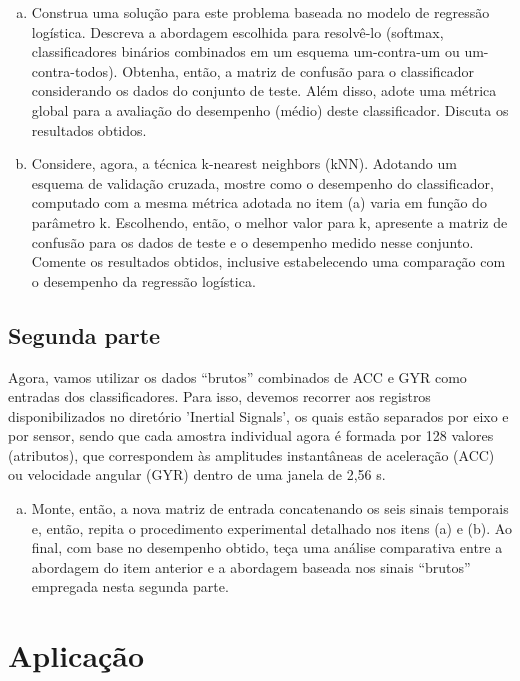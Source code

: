 \documentclass[final,5p]{elsarticle}
\numberwithin{equation}{section}
\begin{document}
        \begin{enumerate}[(a)]
            \item Construa uma solução para este problema baseada no modelo de regressão logística. Descreva a abordagem escolhida para resolvê-lo (softmax, classificadores binários combinados em um esquema um-contra-um ou um-contra-todos). Obtenha, então, a matriz de confusão para o classificador considerando os dados do conjunto de teste. Além disso, adote uma métrica global para a avaliação do desempenho (médio) deste classificador. Discuta os resultados obtidos.
            \item Considere, agora, a técnica k-nearest neighbors (kNN). Adotando um esquema de validação cruzada, mostre como o desempenho do classificador, computado com a mesma métrica adotada no item (a) varia em função do parâmetro k. Escolhendo, então, o melhor valor para k, apresente a matriz de confusão para os dados de teste e o desempenho medido nesse conjunto. Comente os resultados obtidos, inclusive estabelecendo uma comparação com o desempenho da regressão logística.
        \end{enumerate}

    \subsection{Segunda parte}

        Agora, vamos utilizar os dados “brutos” combinados de ACC e GYR como entradas dos classificadores. Para isso, devemos recorrer aos registros disponibilizados no diretório 'Inertial Signals', os quais estão separados por eixo e por sensor, sendo que cada amostra individual agora é formada por 128 valores (atributos), que correspondem às amplitudes instantâneas de aceleração (ACC) ou velocidade angular (GYR) dentro de uma janela de 2,56 s.

        \setcounter{enumi}{3}
        \begin{enumerate}[(a)]
            \item Monte, então, a nova matriz de entrada concatenando os seis sinais temporais e, então, repita o procedimento experimental detalhado nos itens (a) e (b). Ao final, com base no desempenho obtido, teça uma análise comparativa entre a abordagem do item anterior e a abordagem baseada nos sinais “brutos” empregada nesta segunda parte.
        \end{enumerate}

\section{Aplicação}
\end{document}
